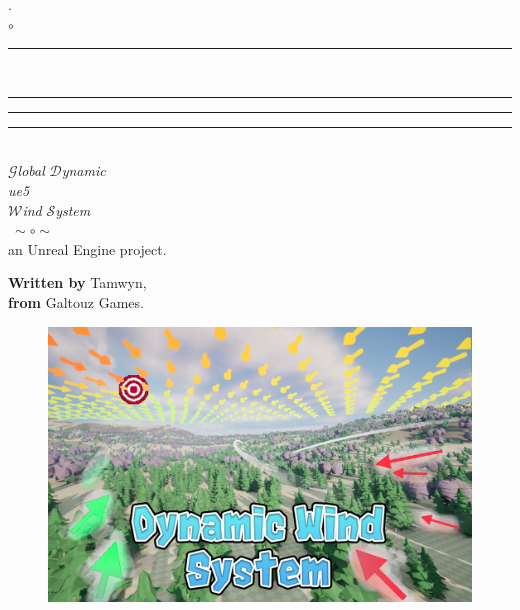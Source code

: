 \documentclass[twoside,a4paper]{article}
\begin{document}

\newcommand{\rem}[1]{\textcolor{TamGreen}{#1}}
\thispagestyle{empty}
\begin{center} 
    \noindent\Huge.\\
    \noindent$\circ$\\
    \rule{0.1\textwidth}{0.75pt}\\
    \rule[20pt]{0.17\textwidth}{0.75pt} \rule[20pt]{0.5\textwidth}{0.75pt} \rule[20pt]{0.17\textwidth}{0.75pt}\\
    \vspace*{30pt}
    \Huge $\mathcal{G}$\textit{lobal} $\mathcal{D}$\textit{ynamic}\\
     \textit{ue5}\\ 
    $\mathcal{W}$\textit{ind}  $\mathcal{S}$\textit{ystem}
    \vspace*{12pt}\\
    $~\sim\circ\sim~$
    \vspace*{48pt}\\
    \normalsize
 an Unreal Engine project.\\

\end{center}
\vspace*{60pt}
\noindent
\normalsize
\textbf{Written by} Tamwyn, \\
\textbf{from} Galtouz Games. \\
\vspace*{12pt}

\begin{figure}[H]
    \centering
    \includegraphics[width=1\textwidth]{Ressources/Thumbnail.png}
\end{figure}
\end{document}
